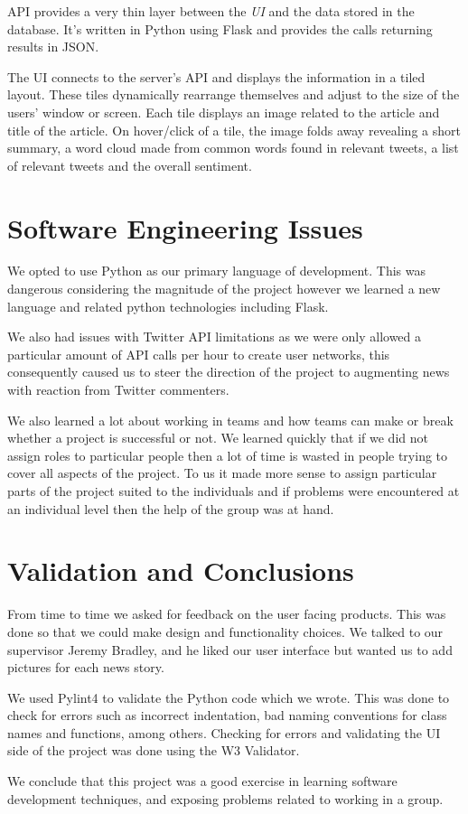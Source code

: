 \documentclass[a4paper,12pt]{article}
\begin{document}
	 API provides a very thin layer between the \emph{UI} and the data stored in the database. It's written in Python using Flask and provides the calls returning results in JSON.
	 
	 The UI connects to the server's API and displays the information in a tiled layout. These tiles dynamically rearrange themselves and adjust to the size of the users' window or screen. Each tile displays an image related to the article and title of the article. On hover/click of a tile, the image folds away revealing a short summary, a word cloud made from common words found in relevant tweets, a list of relevant tweets and the overall sentiment.
  
  \section{Software Engineering Issues}
  
  We opted to use Python as our primary language of development. This was dangerous considering the magnitude of the project however we learned a new language and related python technologies including Flask.
  
  We also had issues with Twitter API limitations as we were only allowed a particular amount of API calls per hour to create user networks, this consequently caused us to steer the direction of the project to augmenting news with reaction from Twitter commenters.
  
  We also learned a lot about working in teams and how teams can make or break whether a project is successful or not. We learned quickly that if we did not assign roles to particular people then a lot of time is wasted in people trying to cover all aspects of the project. To us it made more sense to assign particular parts of the project suited to the individuals and if problems were encountered at an individual level then the help of the group was at hand.
  
  \section{Validation and Conclusions}
  
  
	From time to time we asked for feedback on the user facing products. This was done so that we could make design and functionality choices. We talked to our supervisor Jeremy Bradley, and he liked our user interface but wanted us to add pictures for each news story.
	
	We used Pylint4 to validate the Python code which we wrote. This was done to check for errors such as incorrect indentation, bad naming conventions for class names and functions, among others. Checking for errors and validating the UI side of the project was done using the W3 Validator.
	
	  We conclude that this project was a good exercise in learning software development techniques, and exposing problems related to working in a group.
  
\end{document}
